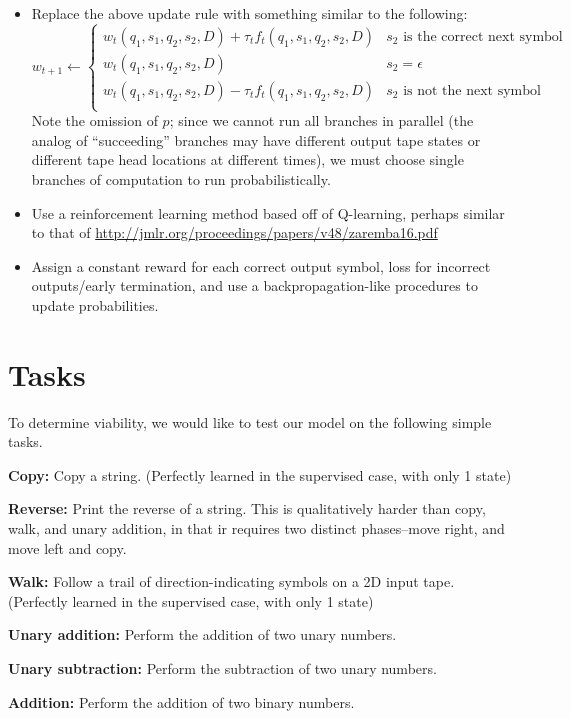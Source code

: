 \documentclass{article}
\begin{document}
\begin{itemize}
    \item Replace the above update rule with something similar to the following:
\[ w_{t+1}\leftarrow 
\begin{cases}
    w_t(q_1, s_1, q_2, s_2, D) + \tau_tf_t(q_1, s_1, q_2, s_2, D) & \text{$s_2$ is the correct next symbol}\\
    w_t(q_1, s_1, q_2, s_2, D) & \text{$s_2 = \epsilon$}\\
    w_t(q_1, s_1, q_2, s_2, D) - \tau_tf_t(q_1, s_1, q_2, s_2, D) & \text{$s_2$ is not the next symbol}\\
\end{cases}
\]
    Note the omission of $p$; since we cannot run all branches in parallel (the analog of ``succeeding'' branches may have different output tape states or different tape head locations at different times), we must choose single branches of computation to run probabilistically. 
    \item Use a reinforcement learning method based off of Q-learning, perhaps similar to that of \url{http://jmlr.org/proceedings/papers/v48/zaremba16.pdf}
    \item Assign a constant reward for each correct output symbol,  loss for incorrect outputs/early termination, and use a backpropagation-like procedures to update probabilities.
\end{itemize}

\section{Tasks}
To determine viability, we would like to test our model on the following simple tasks.

\textbf{Copy:} Copy a string. (Perfectly learned in the supervised case, with only 1 state)

\textbf{Reverse:} Print the reverse of a string. This is qualitatively harder than copy, walk, and unary addition, in that ir requires two distinct phases--move right, and move left and copy. 

\textbf{Walk:} Follow a trail of direction-indicating symbols on a 2D input tape. (Perfectly learned in the supervised case, with only 1 state)

\textbf{Unary addition:} Perform the addition of two unary numbers.

\textbf{Unary subtraction:} Perform the subtraction of two unary numbers.

\textbf{Addition:} Perform the addition of two binary numbers.
\end{document}
